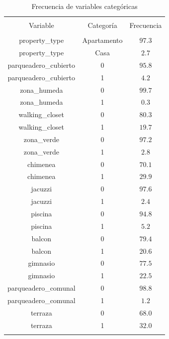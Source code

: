 
\begin{table}[!htbp] \centering 
  \caption{Frecuencia de variables categóricas} 
  \label{tab:frecuencias_categoricas_test} 
\begin{tabular}{@{\extracolsep{5pt}} ccc} 
\\[-1.8ex]\hline 
\hline \\[-1.8ex] 
Variable & Categoría & Frecuencia \\ 
\hline \\[-1.8ex] 
property\_type & Apartamento & $97.3$ \\ 
property\_type & Casa & $2.7$ \\ 
parqueadero\_cubierto & 0 & $95.8$ \\ 
parqueadero\_cubierto & 1 & $4.2$ \\ 
zona\_humeda & 0 & $99.7$ \\ 
zona\_humeda & 1 & $0.3$ \\ 
walking\_closet & 0 & $80.3$ \\ 
walking\_closet & 1 & $19.7$ \\ 
zona\_verde & 0 & $97.2$ \\ 
zona\_verde & 1 & $2.8$ \\ 
chimenea & 0 & $70.1$ \\ 
chimenea & 1 & $29.9$ \\ 
jacuzzi & 0 & $97.6$ \\ 
jacuzzi & 1 & $2.4$ \\ 
piscina & 0 & $94.8$ \\ 
piscina & 1 & $5.2$ \\ 
balcon & 0 & $79.4$ \\ 
balcon & 1 & $20.6$ \\ 
gimnasio & 0 & $77.5$ \\ 
gimnasio & 1 & $22.5$ \\ 
parqueadero\_comunal & 0 & $98.8$ \\ 
parqueadero\_comunal & 1 & $1.2$ \\ 
terraza & 0 & $68.0$ \\ 
terraza & 1 & $32.0$ \\ 
\hline \\[-1.8ex] 
\end{tabular} 
\end{table} 
